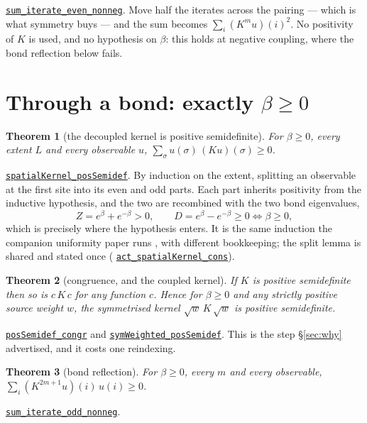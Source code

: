 \documentclass[11pt]{article}
\newtheorem{theorem}{Theorem}[section]
\theoremstyle{definition}
\newcommand{\anchor}{854ff223396630a8a75b0a95a3ada6413f3a395d}
\newcommand{\osline}[3]{%
  \href{https://github.com/lluiseriksson/THE-ERIKSSON-PROGRAMME/blob/\anchor/YangMills/OS/#1.lean\#L#2}{\nolinkurl{#3}}}
\begin{document}
\osline{SpatialReflection}{105}{sum\_iterate\_even\_nonneg}.
Move half the iterates across the pairing --- which is what symmetry buys --- and
the sum becomes $\sum_i (K^{m}u)(i)^2$.  No positivity of $K$ is used, and no
hypothesis on $\beta$: this holds at negative coupling, where the bond
reflection below fails.

\section{Through a bond: exactly $\beta\ge0$}\label{sec:bond}

\begin{theorem}[the decoupled kernel is positive semidefinite]\label{thm:psd}
For $\beta\ge0$, every extent $L$ and every observable $u$,
$\sum_\sigma u(\sigma)\,(Ku)(\sigma) \ge 0$.
\end{theorem}

\osline{SpatialReflection}{147}{spatialKernel\_posSemidef}.
By induction on the extent, splitting an observable at the first site into its
even and odd parts.  Each part inherits positivity from the inductive
hypothesis, and the two are recombined with the two bond eigenvalues,
\[
  Z = e^{\beta}+e^{-\beta} > 0,
  \qquad
  D = e^{\beta}-e^{-\beta} \ge 0 \iff \beta \ge 0 ,
\]
which is precisely where the hypothesis enters.  It is the same induction the
companion uniformity paper runs \cite{ErikssonUniform}, with different
bookkeeping; the split lemma is shared and stated once
(\osline{SpatialReflection}{126}{act\_spatialKernel\_cons}).

\begin{theorem}[congruence, and the coupled kernel]\label{thm:congr}
If $K$ is positive semidefinite then so is $c\,K\,c$ for any function $c$.
Hence for $\beta\ge0$ and \emph{any} strictly positive source weight $w$, the
symmetrised kernel $\sqrt{w}\,K\,\sqrt{w}$ is positive semidefinite.
\end{theorem}

\osline{SpatialReflection}{209}{posSemidef\_congr} and
\osline{SpatialReflection}{226}{symWeighted\_posSemidef}.
This is the step \S\ref{sec:why} advertised, and it costs one reindexing.

\begin{theorem}[bond reflection]\label{thm:bond}
For $\beta\ge0$, every $m$ and every observable,
$\sum_i (K^{2m+1}u)(i)\,u(i) \ge 0$.
\end{theorem}

\osline{SpatialReflection}{240}{sum\_iterate\_odd\_nonneg}.
\end{document}
